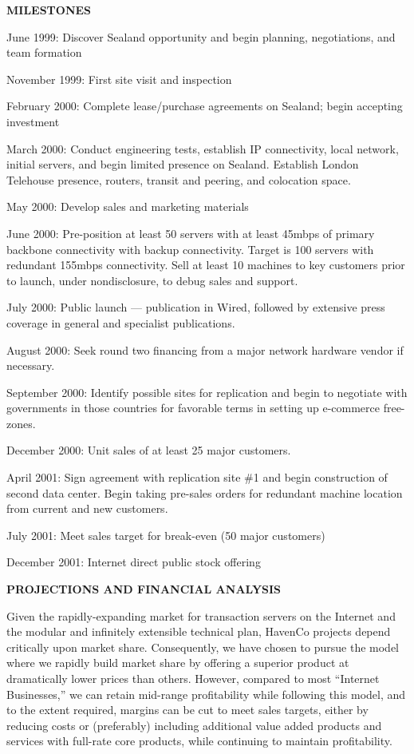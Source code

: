\textbf{MILESTONES}

June 1999: Discover Sealand opportunity and begin planning, negotiations, and team formation

November 1999: First site visit and inspection

February 2000: Complete lease/purchase agreements on Sealand; begin accepting investment

March 2000: Conduct engineering tests, establish IP connectivity, local network, initial servers, and begin limited presence on Sealand. Establish London Telehouse presence, routers, transit and peering, and colocation space.

May 2000: Develop sales and marketing materials

June 2000: Pre-position at least 50 servers with at least 45mbps of primary backbone connectivity with backup connectivity.  Target is 100 servers with redundant 155mbps connectivity. Sell at least 10 machines to key customers prior to launch, under nondisclosure, to debug sales and support.

July 2000: Public launch --- publication in Wired, followed by extensive press coverage in general and specialist publications.

August 2000: Seek round two financing from a major network hardware vendor if necessary.

September 2000: Identify possible sites for replication and begin to negotiate with governments in those countries for favorable terms in setting up e-commerce free-zones.  

December 2000: Unit sales of at least 25 major customers.

April 2001: Sign agreement with replication site \#1 and begin construction of second data center. Begin taking pre-sales orders for redundant machine location from current and new customers.

July 2001: Meet sales target for break-even (50 major customers)

December 2001: Internet direct public stock offering

\textbf{PROJECTIONS AND FINANCIAL ANALYSIS}

Given the rapidly-expanding market for transaction servers on the Internet and the modular and infinitely extensible technical plan, HavenCo projects depend critically upon market share. Consequently, we have chosen to pursue the model where we rapidly build market share by offering a superior product at dramatically lower prices than others. However, compared to most ``Internet Businesses,'' we can retain mid-range profitability while following this model, and to the extent required, margins can be cut to meet sales targets, either by reducing costs or (preferably) including additional value added products and services with full-rate core products, while continuing to maintain profitability.

